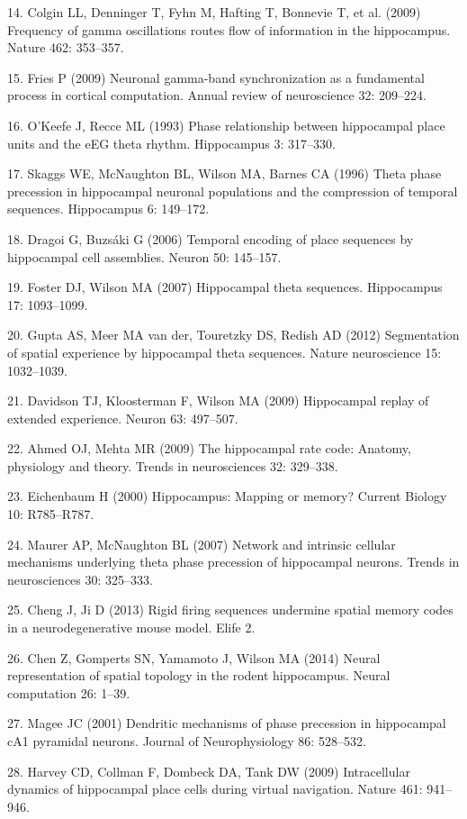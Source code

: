 \documentclass[]{article}
\begin{document}
14. Colgin LL, Denninger T, Fyhn M, Hafting T, Bonnevie T, et al. (2009)
Frequency of gamma oscillations routes flow of information in the
hippocampus. Nature 462: 353--357.

15. Fries P (2009) Neuronal gamma-band synchronization as a fundamental
process in cortical computation. Annual review of neuroscience 32:
209--224.

16. O'Keefe J, Recce ML (1993) Phase relationship between hippocampal
place units and the eEG theta rhythm. Hippocampus 3: 317--330.

17. Skaggs WE, McNaughton BL, Wilson MA, Barnes CA (1996) Theta phase
precession in hippocampal neuronal populations and the compression of
temporal sequences. Hippocampus 6: 149--172.

18. Dragoi G, Buzs{á}ki G (2006) Temporal encoding of place sequences by
hippocampal cell assemblies. Neuron 50: 145--157.

19. Foster DJ, Wilson MA (2007) Hippocampal theta sequences. Hippocampus
17: 1093--1099.

20. Gupta AS, Meer MA van der, Touretzky DS, Redish AD (2012)
Segmentation of spatial experience by hippocampal theta sequences.
Nature neuroscience 15: 1032--1039.

21. Davidson TJ, Kloosterman F, Wilson MA (2009) Hippocampal replay of
extended experience. Neuron 63: 497--507.

22. Ahmed OJ, Mehta MR (2009) The hippocampal rate code: Anatomy,
physiology and theory. Trends in neurosciences 32: 329--338.

23. Eichenbaum H (2000) Hippocampus: Mapping or memory? Current Biology
10: R785--R787.

24. Maurer AP, McNaughton BL (2007) Network and intrinsic cellular
mechanisms underlying theta phase precession of hippocampal neurons.
Trends in neurosciences 30: 325--333.

25. Cheng J, Ji D (2013) Rigid firing sequences undermine spatial memory
codes in a neurodegenerative mouse model. Elife 2.

26. Chen Z, Gomperts SN, Yamamoto J, Wilson MA (2014) Neural
representation of spatial topology in the rodent hippocampus. Neural
computation 26: 1--39.

27. Magee JC (2001) Dendritic mechanisms of phase precession in
hippocampal cA1 pyramidal neurons. Journal of Neurophysiology 86:
528--532.

28. Harvey CD, Collman F, Dombeck DA, Tank DW (2009) Intracellular
dynamics of hippocampal place cells during virtual navigation. Nature
461: 941--946.
\end{document}
